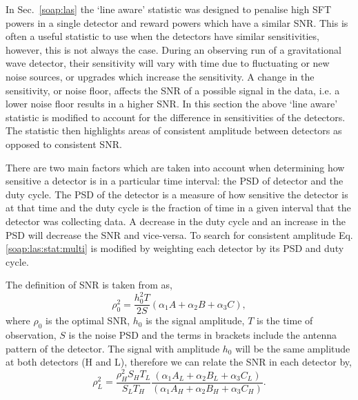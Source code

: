 In Sec.~\ref{soap:las} the `line aware' statistic was designed to penalise high
\gls{SFT} powers in a single detector and reward powers which have a similar
\gls{SNR}. This is often a useful statistic to use when the detectors have
similar sensitivities, however, this is not always the case. During an
observing run of a gravitational wave detector, their sensitivity will vary
with time due to fluctuating or new noise sources, or upgrades which increase the sensitivity. 
A change in the sensitivity, or noise floor,
affects the \gls{SNR} of a possible signal in the data, i.e. a lower noise
floor results in a higher \gls{SNR}.  In this section the above `line aware'
statistic is modified to account for the difference in sensitivities of the
detectors.
The statistic then highlights areas of consistent amplitude between detectors as
opposed to consistent \gls{SNR}.

There are two main factors which are taken into account when determining how
sensitive a detector is in a particular time interval: the \gls{PSD} of
detector and the duty cycle. The \gls{PSD} of the detector is a measure of how
sensitive the detector is at that time and the duty cycle is the fraction of
time in a given interval that the detector was collecting data. A decrease in
the duty cycle and an increase in the \gls{PSD} will decrease the \gls{SNR} and
vice-versa. To search for consistent amplitude Eq.\ref{soap:las:stat:multi} is
modified by weighting each detector by its \gls{PSD} and duty cycle.

The definition of \gls{SNR} is taken from \citep{prix2007SearchContinuous} as, 
\begin{equation}
    \rho_0^2 = \frac{h_0^2 T}{2 S}(\alpha_1A + \alpha_2B + \alpha_3C),
\end{equation}
where $\rho_0$ is the optimal \gls{SNR}, $h_0$ is the signal amplitude, $T$ is
the time of observation, $S$ is the noise \gls{PSD} and the terms in brackets include the antenna pattern of the detector. 
The signal with amplitude $h_0$ will be the same amplitude at both detectors (H and L), therefore we can relate the \gls{SNR} in each detector by,
\begin{equation}
\label{lineawareamp:snrequate}
    \rho_L^2 = \frac{\rho_H^2 S_H T_L}{S_L T_H} \frac{(\alpha_1A_L + \alpha_2B_L + \alpha_3C_L)}{(\alpha_1A_H + \alpha_2B_H + \alpha_3C_H)} .
\end{equation}

